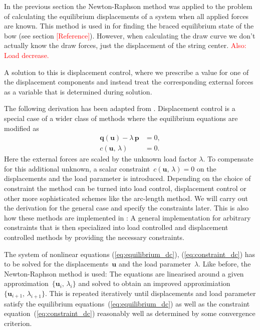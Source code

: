 In the previous section the Newton-Raphson method was applied to the problem of calculating the equilibrium displacements of a system when all applied forces are known. This method is used in \swtitle for finding the braced equilibrium state of the bow (see section \textcolor{red}{[Reference]}). However, when calculating the draw curve we don't actually know the draw forces, just the displacement of the string center. \textcolor{red}{Also: Load decrease.}

A solution to this is displacement control, where we prescribe a value for one of the displacement components and instead treat the corresponding external forces as a variable that is determined during solution.

The following derivation has been adapted from \cite{fem_script_uni_bochum}. Displacement control is a special case of a wider class of methods where the equilibrium equations are modified as
%
\begin{align}
\boldsymbol{q}(\boldsymbol{u}) - \lambda\,\boldsymbol{p} &= 0,\label{eq:equilibrium_dc}\\
c(\boldsymbol{u},\,\lambda) &= 0.\label{eq:constraint_dc}
\end{align}
%
Here the external forces are scaled by the unknown load factor $\lambda$. To compensate for this additional unknown, a scalar constraint~$c(\boldsymbol{u},\,\lambda) = 0$ on the displacements and the load parameter is introduced. Depending on the choice of constraint the method can be turned into load control, displacement control or other more sophisticated schemes like the arc-length method. We will carry out the derivation for the general case and specify the constraints later. This is also how these methods are implemented in \swtitle: A general implementation for arbitrary constraints that is then specialized into load controlled and displacement controlled methods by providing the necessary constraints.

The system of nonlinear equations (\ref{eq:equilibrium_dc}), (\ref{eq:constraint_dc}) has to be solved for the displacements~$\boldsymbol{u}$ and the load parameter~$\lambda$. Like before, the Newton-Raphson method is used: The equations are linearised around a given approximation~$\{\boldsymbol{u}_i,\,\lambda_i\}$ and solved to obtain an improved approximiation~$\{\boldsymbol{u}_{i+1},\,\lambda_{i+1}\}$. This is repeated iteratively until displacements and load parameter satisfy the equilibrium equations~(\ref{eq:equilibrium_dc}) as well as the constraint equation~(\ref{eq:constraint_dc}) reasonably well as determined by some convergence criterion.

